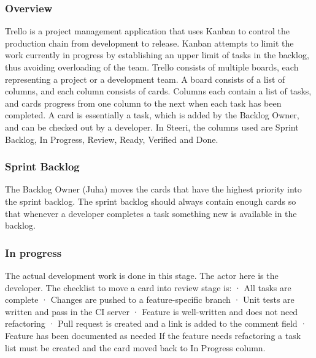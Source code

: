 \documentclass[english]{tktltiki2}
\theoremstyle{definition}
\theoremstyle{remark}
\begin{document}
\subsubsection{Overview}
Trello is a project management application that uses Kanban to control the production chain from development to release. Kanban attempts to limit the work currently in progress by establishing an upper limit of tasks in the backlog, thus avoiding overloading of the team. Trello consists of multiple boards, each representing a project or a development team. A board consists of a list of columns, and each column consists of cards. Columns each contain a list of tasks, and cards progress from one column to the next when each task has been completed. A card is essentially a task, which is added by the Backlog Owner, and can be checked out by a developer. In Steeri, the columns used are Sprint Backlog, In Progress, Review, Ready, Verified and Done. 

\subsubsection{Sprint Backlog}
The Backlog Owner (Juha) moves the cards that have the highest priority into the sprint backlog. The sprint backlog should always contain enough cards so that whenever a developer completes a task something new is available in the backlog.

\subsubsection{In progress}
The actual development work is done in this stage. The actor here is the developer. The checklist to move a card into review stage is:
·       All tasks are complete
·       Changes are pushed to a feature-specific branch
·       Unit tests are written and pass in the CI server
·       Feature is well-written and does not need refactoring
·       Pull request is created and a link is added to the comment field
·       Feature has been documented as needed
If the feature needs refactoring a task list must be created and the card moved back to In Progress column.
\end{document}
